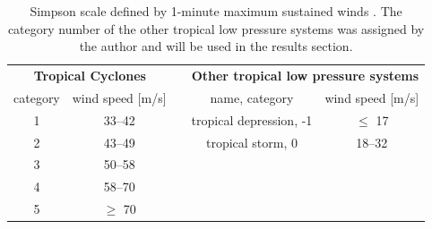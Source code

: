 \begingroup
\setlength{\tabcolsep}{10pt} %
\renewcommand{\arraystretch}{1.5} %
\begin{table}[hbt!]
	\centering
	\begin{tabular}{|c|c|c|c|c|}
		\cline{1-2} \cline{4-5}
		\multicolumn{2}{|c|}{\textbf{Tropical Cyclones}} &                      & \multicolumn{2}{c|}{\textbf{Other tropical low pressure systems}}                                                  \\ \cline{1-2} \cline{4-5}
		category                                         & wind speed {[}m/s{]} &                                                                   & name, category          & wind speed {[}m/s{]} \\ \cline{1-2} \cline{4-5}
		1                                                & 33--42               &                                                                   & tropical depression, -1 & $\leq$ 17            \\
		2                                                & 43--49               &                                                                   & tropical storm, 0       & 18--32               \\
		3                                                & 50--58               &                                                                   &                         &                      \\
		4                                                & 58--70               &                                                                   &                         &                      \\
		5                                                & $\geq$ 70            &                                                                   &                         &                      \\ \cline{1-2} \cline{4-5}
	\end{tabular}
	\caption{Simpson scale defined by 1-minute maximum sustained winds \cite{simpson}. The category number of the other tropical low pressure systems was assigned by the author and will be used in the results section.}
	\label{tab:simpson-scale}
\end{table}
\endgroup

